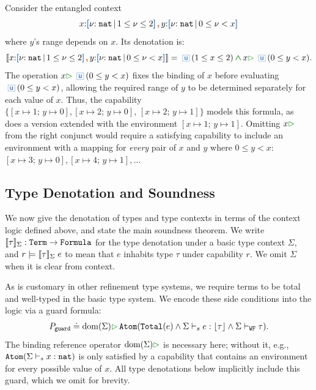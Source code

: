 \begin{example}%
  \label{ex-variable-reference}
  Consider the entangled context
  \[x{:}\urt{\Nat}{1 \leq \vnu
    \leq 2} \ctcomma y{:}\urt{\Nat}{0 \leq \vnu < x}\]
\noindent where $y$'s
  range depends on $x$.  Its denotation is:
  \[
    \denot{x{:}\urt{\Nat}{1 \leq \vnu \leq 2} \ctcomma y{:}\urt{\Nat}{0 \leq \vnu < x}}
    = \angelic\,(1 \leq x \leq 2) \chland \forallM{x}\,\angelic\,(0 \leq y < x).
  \]
  The operation $\forallM{x}\,\angelic\,(0 \leq y < x)$ fixes the
  binding of $x$ before evaluating $\angelic\,(0 \leq y < x)$,
  allowing the required range of $y$ to be determined separately for
  each value of $x$.  Thus, the capability %
  \mbox{$\{[x \mapsto 1;\, y \mapsto 0], [x \mapsto 2;\, y \mapsto
    0],\, [x \mapsto 2;\, y \mapsto 1]\}$} models this formula, as
  does a version extended with the environment %
  \mbox{$[x \mapsto 1;\, y \mapsto 1]$}.  Omitting $\forallM{x}$ from
  the right conjunct would require a satisfying capability to include
  an environment with a mapping for \emph{every} pair of $x$ and $y$
  where $0 \leq y < x$:
  $[x \mapsto 3;\, y \mapsto 0], [x \mapsto 4;\, y \mapsto 1], \ldots$
\end{example}

\subsection{Type Denotation and Soundness}%
\label{subsec:denotation}

We now give the denotation of types and type contexts in terms of the
context logic defined above, and state the main soundness theorem.  We
write $\llbracket {\tau} \rrbracket_\Sigma : {\tt Term} \to {\tt Formula}$ for the
type denotation under a basic type context $\Sigma$, and
$r \models \llbracket {\tau} \rrbracket_\Sigma\;e$ to mean that $e$ inhabits type
$\tau$ under capability $r$.  We omit $\Sigma$ when it is clear from
context.

As is customary in other refinement type systems, we require terms to
be total and well-typed in the basic type system.  We encode these
side conditions into the logic via a guard formula: \vspace{-0.2em}
\begin{align*}
  P_{\Code{guard}} \doteq \forallM{\Dom{\Sigma}}\,\Code{Atom}(\Code{Total}(e) \land \Sigma \vdash_s e : \eraserf{\tau} \land \Sigma \vdash_{\Code{WF}} \tau).
\end{align*}
The binding reference operator $\forallM{\Dom{\Sigma}}$ is necessary
here; without it, e.g., ${\tt Atom}(\Sigma \vdash_s x : {\tt nat})$ is
only satisfied by a capability that contains an environment for every
possible value of $x$.  All type denotations below implicitly include
this guard, which we omit for brevity.

